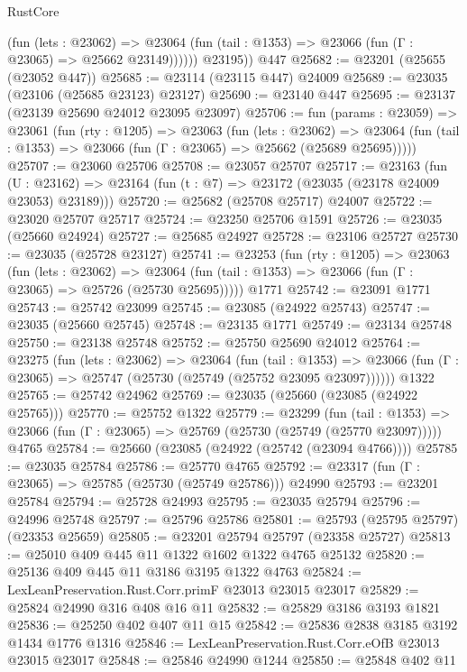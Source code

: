 \begin{lexlean}{RustCore}
\begin{coremodule}
              (fun (lets : @23062) =>
              @23064 (fun (tail : @1353) => @23066 (fun (Γ : @23065) => @25662 @23149))))))
        @23195))
    @447
@25682 := @23201 (@25655 (@23052 @447))
@25685 := @23114 (@23115 @447) @24009
@25689 := @23035 (@23106 (@25685 @23123) @23127)
@25690 := @23140 @447
@25695 := @23137 (@23139 @25690 @24012 @23095 @23097)
@25706 := fun (params : @23059) =>
  @23061
    (fun (rty : @1205) =>
    @23063
      (fun (lets : @23062) =>
      @23064 (fun (tail : @1353) => @23066 (fun (Γ : @23065) => @25662 (@25689 @25695)))))
@25707 := @23060 @25706
@25708 := @23057 @25707
@25717 := @23163
    (fun (U : @23162) => @23164 (fun (t : @7) => @23172 (@23035 (@23178 @24009 @23053) @23189)))
@25720 := @25682 (@25708 @25717) @24007
@25722 := @23020 @25707 @25717
@25724 := @23250 @25706 @1591
@25726 := @23035 (@25660 @24924)
@25727 := @25685 @24927
@25728 := @23106 @25727
@25730 := @23035 (@25728 @23127)
@25741 := @23253
    (fun (rty : @1205) =>
    @23063
      (fun (lets : @23062) =>
      @23064 (fun (tail : @1353) => @23066 (fun (Γ : @23065) => @25726 (@25730 @25695)))))
    @1771
@25742 := @23091 @1771
@25743 := @25742 @23099
@25745 := @23085 (@24922 @25743)
@25747 := @23035 (@25660 @25745)
@25748 := @23135 @1771
@25749 := @23134 @25748
@25750 := @23138 @25748
@25752 := @25750 @25690 @24012
@25764 := @23275
    (fun (lets : @23062) =>
    @23064
      (fun (tail : @1353) =>
      @23066 (fun (Γ : @23065) => @25747 (@25730 (@25749 (@25752 @23095 @23097))))))
    @1322
@25765 := @25742 @24962
@25769 := @23035 (@25660 (@23085 (@24922 @25765)))
@25770 := @25752 @1322
@25779 := @23299
    (fun (tail : @1353) => @23066 (fun (Γ : @23065) => @25769 (@25730 (@25749 (@25770 @23097)))))
    @4765
@25784 := @25660 (@23085 (@24922 (@25742 (@23094 @4766))))
@25785 := @23035 @25784
@25786 := @25770 @4765
@25792 := @23317 (fun (Γ : @23065) => @25785 (@25730 (@25749 @25786))) @24990
@25793 := @23201 @25784
@25794 := @25728 @24993
@25795 := @23035 @25794
@25796 := @24996 @25748
@25797 := @25796 @25786
@25801 := @25793 (@25795 @25797) (@23353 @25659)
@25805 := @23201 @25794 @25797 (@23358 @25727)
@25813 := @25010 @409 @445 @11 @1322 @1602 @1322 @4765 @25132
@25820 := @25136 @409 @445 @11 @3186 @3195 @1322 @4763
@25824 := LexLeanPreservation.Rust.Corr.primF @23013 @23015 @23017
@25829 := @25824 @24990 @316 @408 @16 @11
@25832 := @25829 @3186 @3193 @1821
@25836 := @25250 @402 @407 @11 @15
@25842 := @25836 @2838 @3185 @3192 @1434 @1776 @1316
@25846 := LexLeanPreservation.Rust.Corr.eOfB @23013 @23015 @23017
@25848 := @25846 @24990 @1244
@25850 := @25848 @402 @11

\end{coremodule}
\end{lexlean}
